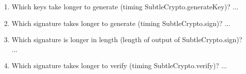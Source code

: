 \documentclass[12pt,letterpaper,twoside]{article}
\begin{document}
\begin{enumerate}
    \item Which keys take longer to generate (timing {\color{blue} SubtleCrypto.generateKey})?
    {\color{pruple} ... }

    \item Which signature takes longer to generate (timing {\color{blue} SubtleCrypto.sign})?
    {\color{pruple} ... }

    \item Which signature is longer in length (length of output of {\color{blue} SubtleCrypto.sign})?
    {\color{pruple} ... }

    \item Which signature takes longer to verify (timing {\color{blue} SubtleCrypto.verify})?
    {\color{pruple} ... }

\end{enumerate}
\end{document}
